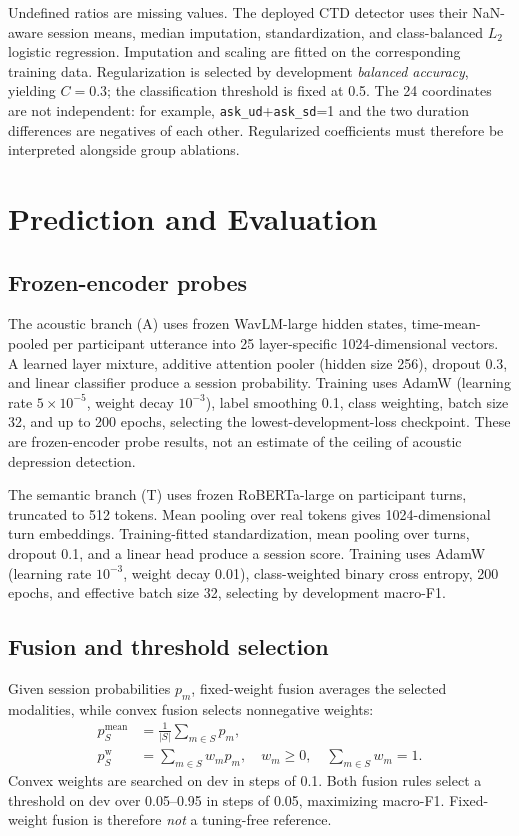 \documentclass{article}
\begin{document}
Undefined ratios are missing values. The deployed CTD detector uses their NaN-aware session means, median imputation, standardization, and class-balanced $L_2$ logistic regression. Imputation and scaling are fitted on the corresponding training data. Regularization is selected by development \emph{balanced accuracy}, yielding $C=0.3$; the classification threshold is fixed at 0.5. The 24 coordinates are not independent: for example, \texttt{ask\_ud}+\texttt{ask\_sd}=1 and the two duration differences are negatives of each other. Regularized coefficients must therefore be interpreted alongside group ablations.

\section{Prediction and Evaluation}
\label{sec:protocol}
\subsection{Frozen-encoder probes}
\label{sec:modalities}
The acoustic branch (A) uses frozen WavLM-large hidden states, time-mean-pooled per participant utterance into 25 layer-specific 1024-dimensional vectors. A learned layer mixture, additive attention pooler (hidden size 256), dropout 0.3, and linear classifier produce a session probability. Training uses AdamW (learning rate $5\times10^{-5}$, weight decay $10^{-3}$), label smoothing 0.1, class weighting, batch size 32, and up to 200 epochs, selecting the lowest-development-loss checkpoint. These are frozen-encoder probe results, not an estimate of the ceiling of acoustic depression detection.

The semantic branch (T) uses frozen RoBERTa-large on participant turns, truncated to 512 tokens. Mean pooling over real tokens gives 1024-dimensional turn embeddings. Training-fitted standardization, mean pooling over turns, dropout 0.1, and a linear head produce a session score. Training uses AdamW (learning rate $10^{-3}$, weight decay 0.01), class-weighted binary cross entropy, 200 epochs, and effective batch size 32, selecting by development macro-F1.

\subsection{Fusion and threshold selection}
\label{sec:fusion}
Given session probabilities $p_m$, fixed-weight fusion averages the selected modalities, while convex fusion selects nonnegative weights:
\[
\begin{aligned}
p_S^{\mathrm{mean}}&=\frac{1}{|S|}\sum_{m\in S}p_m,\\
p_S^{\mathrm{w}}&=\sum_{m\in S}w_mp_m,\quad w_m\geq0,\quad \sum_{m\in S}w_m=1.
\end{aligned}
\]
Convex weights are searched on dev in steps of 0.1. Both fusion rules select a threshold on dev over 0.05--0.95 in steps of 0.05, maximizing macro-F1. Fixed-weight fusion is therefore \emph{not} a tuning-free reference.
\end{document}
